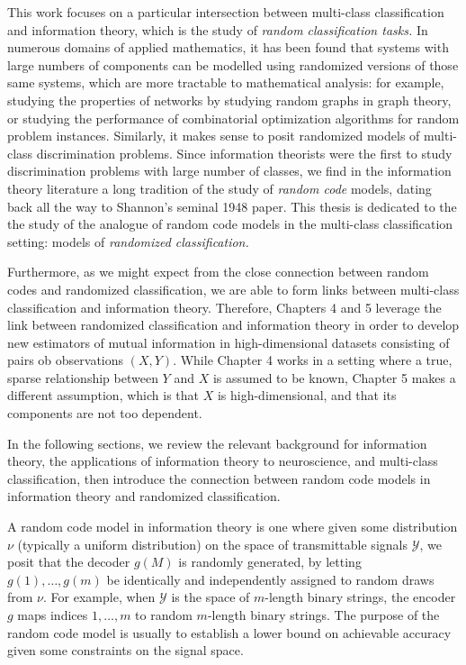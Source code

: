 This work focuses on a particular intersection between multi-class
classification and information theory, which is the study of
\emph{random classification tasks.}  In numerous domains of applied
mathematics, it has been found that systems with large numbers of
components can be modelled using randomized versions of those same
systems, which are more tractable to mathematical analysis: for
example, studying the properties of networks by studying random graphs
in graph theory, or studying the performance of combinatorial
optimization algorithms for random problem instances.  Similarly, it
makes sense to posit randomized models of multi-class discrimination
problems.  Since information theorists were the first to study
discrimination problems with large number of classes, we find in the
information theory literature a long tradition of the study of
\emph{random code} models, dating back all the way to Shannon's
seminal 1948 paper.  This thesis is dedicated to the the study of the
analogue of random code models in the multi-class classification
setting: models of \emph{randomized classification.}

Furthermore, as we might expect from the close connection between
random codes and randomized classification, we are able to form links
between multi-class classification and information theory.  Therefore,
Chapters 4 and 5 leverage the link between randomized classification
and information theory in order to develop new estimators of mutual
information in high-dimensional datasets consisting of pairs ob
observations $(X, Y)$.  While Chapter 4 works in a setting where a
true, sparse relationship between $Y$ and $X$ is assumed to be known,
Chapter 5 makes a different assumption, which is that $X$ is
high-dimensional, and that its components are not too dependent.

In the following sections, we review the relevant background for
information theory, the applications of information theory to
neuroscience, and multi-class classification, then introduce the
connection between random code models in information theory and
randomized classification.




A random code model in information theory is one where given some
distribution $\nu$ (typically a uniform distribution) on the space of
transmittable signals $\mathcal{Y}$, we posit that the decoder $g(M)$
is randomly generated, by letting $g(1),\hdots, g(m)$ be identically
and independently assigned to random draws from $\nu$.  For example,
when $\mathcal{Y}$ is the space of $m$-length binary strings, the
encoder $g$ maps indices $1, \hdots, m$ to random $m$-length binary
strings.  The purpose of the random code model is usually to establish
a lower bound on achievable accuracy given some constraints on the
signal space.

